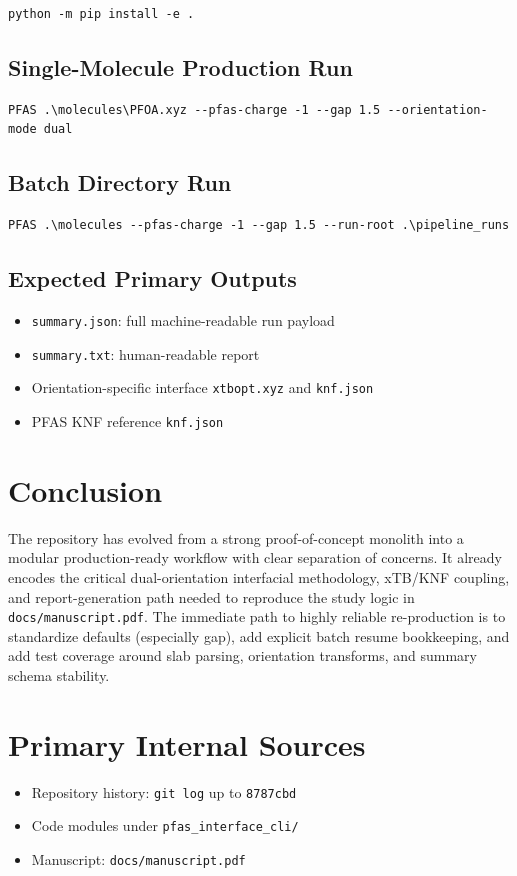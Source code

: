 ﻿\documentclass[11pt]{article}
\begin{document}
\begin{verbatim}
python -m pip install -e .
\end{verbatim}

\subsection{Single-Molecule Production Run}
\begin{verbatim}
PFAS .\molecules\PFOA.xyz --pfas-charge -1 --gap 1.5 --orientation-mode dual
\end{verbatim}

\subsection{Batch Directory Run}
\begin{verbatim}
PFAS .\molecules --pfas-charge -1 --gap 1.5 --run-root .\pipeline_runs
\end{verbatim}

\subsection{Expected Primary Outputs}
\begin{itemize}[leftmargin=1.5em]
\item \texttt{summary.json}: full machine-readable run payload
\item \texttt{summary.txt}: human-readable report
\item Orientation-specific interface \texttt{xtbopt.xyz} and \texttt{knf.json}
\item PFAS KNF reference \texttt{knf.json}
\end{itemize}

\section{Conclusion}
The repository has evolved from a strong proof-of-concept monolith into a modular production-ready workflow with clear separation of concerns. It already encodes the critical dual-orientation interfacial methodology, xTB/KNF coupling, and report-generation path needed to reproduce the study logic in \texttt{docs/manuscript.pdf}. The immediate path to highly reliable re-production is to standardize defaults (especially gap), add explicit batch resume bookkeeping, and add test coverage around slab parsing, orientation transforms, and summary schema stability.

\section*{Primary Internal Sources}
\begin{itemize}[leftmargin=1.5em]
\item Repository history: \texttt{git log} up to \texttt{8787cbd}
\item Code modules under \texttt{pfas\_interface\_cli/}
\item Manuscript: \texttt{docs/manuscript.pdf}
\end{itemize}
\end{document}
